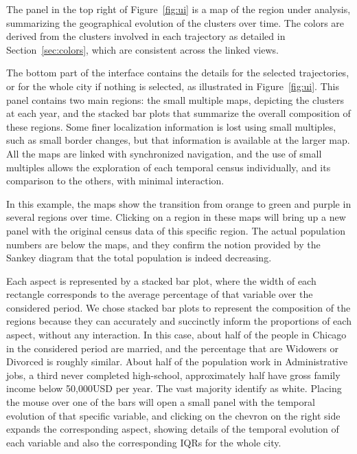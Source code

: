 The panel in the top right of Figure~\ref{fig:ui} is a map of the region under
analysis, summarizing the geographical evolution of the clusters over time.  The
colors are derived from the clusters involved in each trajectory as detailed in
Section~\ref{sec:colors}, which are consistent across the linked views. 

The bottom part of the interface contains the details for the selected
trajectories, or for the whole city if nothing is selected, as illustrated in
Figure~\ref{fig:ui}. This panel contains two main regions: the small multiple
maps, depicting the clusters at each year, and the stacked bar plots that
summarize the overall composition of these regions. Some finer localization
information is lost using small multiples, such as small border changes, but
that information is available at the larger map. All the maps are linked with
synchronized navigation, and the use of small multiples allows the exploration of
each temporal census individually, and its comparison to the others, with
minimal interaction. 

In this example, the maps show the transition from orange to green and purple in
several regions over time. Clicking on a region in these maps will bring up a
new panel with the original census data of this specific region. The actual
population numbers are below the maps, and they confirm the notion provided by
the Sankey diagram that the total population is indeed decreasing. 

Each aspect is represented by a stacked bar plot, where the width of each
rectangle corresponds to the average percentage of that variable over the
considered period. We chose stacked bar plots to represent the composition of
the regions because they can accurately and succinctly inform the proportions of
each aspect, without any interaction. In this case, about half of the people in
Chicago in the considered period are married, and the percentage that are
Widowers or Divorced is roughly similar. About half of the population work in
Administrative jobs, a third never completed high-school, approximately half
have gross family income below 50,000USD per year. The vast majority identify as
white. Placing the mouse over one of the bars will open a small panel with the
temporal evolution of that specific variable, and clicking on the chevron on the
right side expands the corresponding aspect, showing details of the temporal
evolution of each variable and also the corresponding IQRs for the whole city.